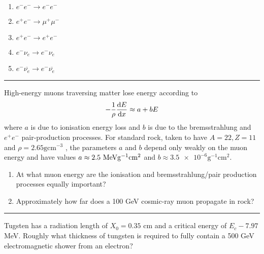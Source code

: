 \begin{solution}
\begin{enumerate}[label=(\alph*)]
    \item $e^-e^- \to e^-e^-$

    \item $e^+e^- \to \mu^+\mu^-$
    \item $e^+e^- \to e^+e^-$
    \item $e^-\nu_e \to e^-\nu_e$
    \item $e^-\overbar{\nu_e} \to e^-\overbar{\nu_e}$
\end{enumerate}
\end{solution}

\noindent\rule{7in}{1.5pt}


\begin{problem}{1.7}
High-energy muons traversing matter lose energy according to
\begin{align*}
    -\frac{1}{\rho} \frac{\mathop{}\!\mathrm{d} E}{\mathop{}\!\mathrm{d} x} \approx a + bE 
\end{align*}
where $a$ is due to ionisation energy loss and $b$ is due to the bremsstrahlung and $e^+e^-$ pair-production processes. 
For standard rock, taken to have $A = 22, Z = 11$ and $\rho = 2.65 \unit{\gram\centi\metre^{-3}}$ , the parameters $a$ and $b$ depend only weakly on 
the muon energy and have values $a \approx 2.5 \MeV\unit{\gram^{-1}\centi\metre^2}$ and $b \approx \num{3.5e-6} \unit{\gram^{-1}\centi\metre^2}$.
\begin{enumerate}[label=(\alph*)]
    \item At what muon energy are the ionisation and bremsstrahlung/pair production processes equally important?
    \item Approximately how far does a 100 GeV cosmic-ray muon propagate in rock?
\end{enumerate}
\end{problem}
\begin{solution}

\end{solution}

\noindent\rule{7in}{1.5pt}


\begin{problem}{1.8}
Tugsten has a radiation length of $X_0=0.35$ cm and a critical energy of $E_c-7.97$ MeV. Roughly what thickness of tungsten is required to fully contain a 500 GeV electromagnetic shower from an electron?
\end{problem}

